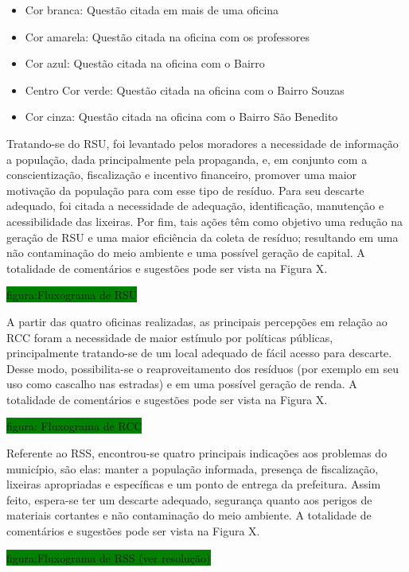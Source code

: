 	\begin{itemize}
	\item Cor branca: Questão citada em mais de uma oficina
	\item Cor amarela: Questão citada na oficina com os professores
	\item Cor azul: Questão citada na oficina com o Bairro 
	\item Centro Cor verde: Questão citada na oficina com o Bairro Souzas
	\item Cor cinza: Questão citada na oficina com o Bairro São Benedito
	\end{itemize}
	
	Tratando-se do RSU, foi levantado pelos moradores a necessidade de informação a população, dada principalmente pela propaganda, e, em conjunto com a conscientização, fiscalização e incentivo financeiro, promover uma maior motivação da população para com esse tipo de resíduo. Para seu descarte adequado, foi citada a necessidade de adequação, identificação, manutenção e acessibilidade das lixeiras. Por fim, tais ações têm como objetivo uma redução na geração de RSU e uma maior eficiência da coleta de resíduo; resultando em uma não contaminação do meio ambiente e uma possível geração de capital. A totalidade de comentários e sugestões pode ser vista na Figura X.
	
	\colorbox{green}{figura:Fluxograma de RSU}
	
	A partir das quatro oficinas realizadas, as principais percepções em relação ao RCC foram a necessidade de maior estímulo por políticas públicas, principalmente tratando-se de um local adequado de fácil acesso para descarte. Desse modo, possibilita-se o reaproveitamento dos resíduos (por exemplo em seu uso como cascalho nas estradas) e em uma possível geração de renda. A totalidade de comentários e sugestões pode ser vista na Figura X.
	
	\colorbox{green}{figura: Fluxograma de RCC}
	
	Referente ao RSS, encontrou-se quatro principais indicações aos problemas do município, são elas: manter a população informada, presença de fiscalização, lixeiras apropriadas e específicas e um ponto de entrega da prefeitura. Assim feito, espera-se ter um descarte adequado, segurança quanto aos perigos de materiais cortantes e não contaminação do meio ambiente. A totalidade de comentários e sugestões pode ser vista na Figura X.
	
	\colorbox{green}{figura:Fluxograma de RSS (ver resolução)}
	
